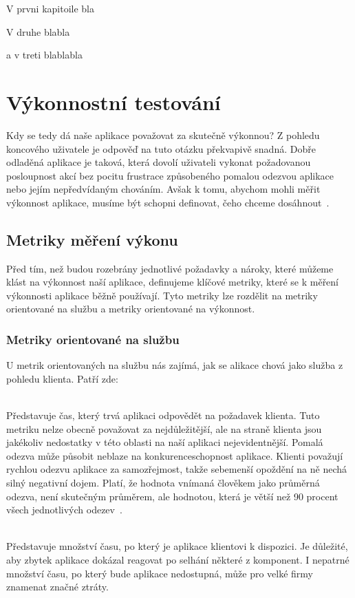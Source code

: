 \documentclass[122pt,oneside]{fithesis}
\begin{document}
V prvni kapitoile bla

V druhe blabla

a v treti blablabla


\chapter{Výkonnostní testování}

Kdy se tedy dá naše aplikace považovat za skutečně výkonnou? Z pohledu koncového uživatele je odpověď na tuto otázku překvapivě snadná. Dobře odladěná aplikace je taková, která dovolí uživateli vykonat požadovanou posloupnost akcí bez pocitu frustrace způsobeného pomalou odezvou aplikace nebo jejím nepředvídaným chováním. Avšak k tomu, abychom mohli měřit výkonnost aplikace, musíme být schopni definovat, čeho chceme dosáhnout~\cite{molyneaux09}.

\section{Metriky měření výkonu}
Před tím, než budou rozebrány jednotlivé požadavky a nároky, které můžeme klást na výkonnost naší aplikace, definujeme klíčové metriky, které se k měření výkonnosti aplikace běžně používají. Tyto metriky lze rozdělit na metriky orientované na službu a metriky orientované na výkonnost.
\subsection{Metriky orientované na službu}
U metrik orientovaných na službu nás zajímá, jak se alikace chová jako služba z pohledu klienta. Patří zde: 

\vspace{5 mm}
\\\indent Představuje čas, který trvá aplikaci odpovědět na požadavek klienta. Tuto metriku nelze obecně považovat za nejdůležitější, ale na straně klienta jsou jakékoliv nedostatky v této oblasti na naší aplikaci nejevidentnější. Pomalá odezva může působit neblaze na konkurenceschopnost aplikace. Klienti považují rychlou odezvu aplikace za samozřejmost, takže sebemenší opoždění na ně nechá silný negativní dojem. Platí, že hodnota vnímaná člověkem jako průměrná odezva, není skutečným průměrem, ale hodnotou, která je větší než 90 procent všech jednotlivých odezev~\cite{haines06}.

\vspace{5 mm}
\\\indent Představuje množství času, po který je aplikace klientovi k dispozici. Je důležité, aby zbytek aplikace dokázal reagovat po selhání některé z komponent. I nepatrné množství času, po který bude aplikace nedostupná, může pro velké firmy znamenat značné ztráty.
\end{document}
